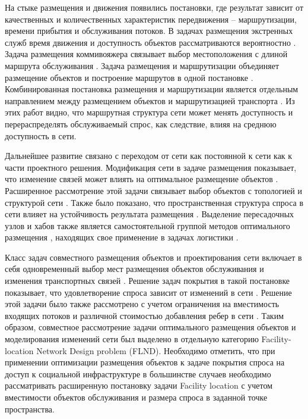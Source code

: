 \documentclass[14pt,a4paper]{extarticle}
\begin{document}
На стыке размещения и движения появились постановки, где результат зависит от качественных и количественных характеристик передвижения -- маршрутизации, времени прибытия и обслуживания потоков. В задачах размещения экстренных служб время движения и доступность объектов рассматриваются вероятностно \cite{daskin1987emergency}. Задача размещения коммивояжера связывает выбор местоположения с длиной маршрута обслуживания \cite{simchi1988tspLocation}. Задача размещения и маршрутизации объединяет размещение объектов и построение маршрутов в одной постановке \cite{laporte1988locationRouting}. Комбинированная постановка размещения и маршрутизации является отдельным направлением между размещением объектов и маршрутизацией транспорта \cite{min1998locationRouting}. Из этих работ видно, что маршрутная структура сети может менять доступность и перераспределять обслуживаемый спрос, как следствие, влияя на среднюю доступность в сети.

Дальнейшее развитие связано с переходом от сети как постоянной к сети как к части проектного решения. Модификация сети в задаче размещения показывает, что изменение связей может влиять на оптимальное размещение объектов \cite{berman1992networkModification}. Расширенное рассмотрение этой задачи связывает выбор объектов с топологией и структурой сети \cite{hodgson1992networkLocation}. Также было показано, что пространственная структура спроса в сети влияет на устойчивость результата размещения \cite{peeters1995spatialStructure}. Выделение пересадочных узлов и хабов также является самостоятельной группой методов оптимального размещения \cite{campbell1994hub}, находящих свое применение в задачах логистики \cite{klincewicz1998hub} \cite{revelle1996plantLocation}.

Класс задач совместного размещения объектов и проектирования сети включает в себя одновременный выбор мест размещения объектов обслуживания и изменения транспортных связей  \cite{daskin1993towardIntegrated} \cite{melkote1996integrated}. Решение задач покрытия в такой постановке показывает, что удовлетворение спроса зависит от изменений в сети \cite{melkote1998maximumCovering}. Решение этой задачи было также рассмотрено с учетом ограничения на вместимость входящих потоков и различной стоимостью добавления ребер в сети \cite{melkote2000capacitated}. Таким образом, совместное рассмотрение задачи оптимального размещения объектов и моделирования изменений сети был выделено в отдельную категорию Facility-location Network Design problem (FLND)\cite{melkote2001integrated}. Необходимо отметить, что при применении оптимизации размещения объектов к задаче покрытия спроса на доступ к социальной инфраструктуре в большинстве случаев необходимо рассматривать расширенную постановку задачи Facility location с учетом вместимости объектов обслуживания и размера спроса в заданной точке пространства.
\end{document}
